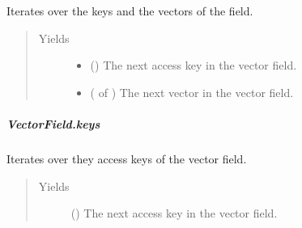 \documentclass[letterpaper,10pt,english]{sphinxmanual}
\begin{document}
\begin{fulllineitems}
\begin{fulllineitems}
\label{\detokenize{api/generated/directional_clustering.fields.VectorField.items:directional_clustering.fields.VectorField.items}}
Iterates over the keys and the vectors of the field.
\begin{quote}\begin{description}
\item[{Yields}] \leavevmode\begin{itemize}
\item {} 
 () \textendash{} The next access key in the vector field.

\item {} 
 ( of ) \textendash{} The next vector in the vector field.

\end{itemize}

\end{description}\end{quote}

\end{fulllineitems}



\subparagraph{VectorField.keys}
\label{\detokenize{api/generated/directional_clustering.fields.VectorField.keys:vectorfield-keys}}\label{\detokenize{api/generated/directional_clustering.fields.VectorField.keys::doc}}

\begin{fulllineitems}
\label{\detokenize{api/generated/directional_clustering.fields.VectorField.keys:directional_clustering.fields.VectorField.keys}}
Iterates over they access keys of the vector field.
\begin{quote}\begin{description}
\item[{Yields}] \leavevmode
{} () \textendash{} The next access key in the vector field.

\end{description}\end{quote}


\end{fulllineitems}
\end{fulllineitems}
\end{document}

